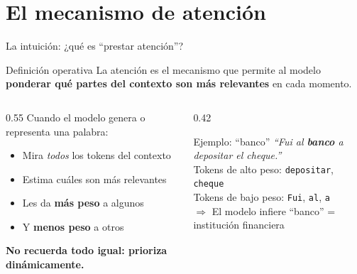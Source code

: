 \documentclass[aspectratio=169, 10pt]{beamer}
\newcommand{\highlight}[1]{\textcolor{fenred}{\textbf{#1}}}
\newcommand{\concept}[1]{\textcolor{fenblue}{\textbf{#1}}}
\begin{document}
\section{El mecanismo de atención}

\begin{frame}{La intuición: ¿qué es ``prestar atención''?}

  \begin{block}{Definición operativa}
    La atención es el mecanismo que permite al modelo \concept{ponderar qué partes del contexto son más relevantes} en cada momento.
  \end{block}

  \vspace{0.5em}
  \begin{columns}[T]
    \begin{column}{0.55\textwidth}
      Cuando el modelo genera o representa una palabra:
      \begin{itemize}
        \item Mira \textit{todos} los tokens del contexto
        \item Estima cuáles son más relevantes
        \item Les da \highlight{más peso} a algunos
        \item Y \highlight{menos peso} a otros
      \end{itemize}
      \vspace{0.4em}
      \textbf{No recuerda todo igual: prioriza dinámicamente.}
    \end{column}
    \begin{column}{0.42\textwidth}
      \begin{exampleblock}{Ejemplo: ``banco''}
        \textit{``Fui al \textbf{banco} a depositar el cheque.''}\\[0.3em]
        Tokens de alto peso: \texttt{depositar}, \texttt{cheque}\\[0.2em]
        Tokens de bajo peso: \texttt{Fui}, \texttt{al}, \texttt{a}\\[0.3em]
        $\Rightarrow$ El modelo infiere ``banco'' = institución financiera
      \end{exampleblock}
    \end{column}
  \end{columns}

\end{frame}
\end{document}

